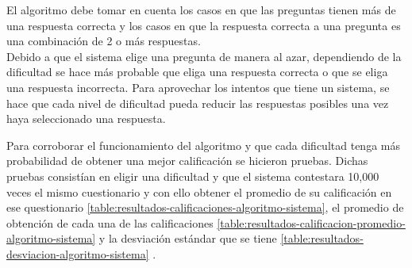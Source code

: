 \clearpage
    El algoritmo debe tomar en cuenta los casos en que las preguntas tienen más de una respuesta correcta 
    y los casos en que la respuesta correcta a una pregunta es una combinación de 2 o más respuestas.\\
\clearpage
    Debido a que el sistema elige una pregunta de manera al azar, 
    dependiendo de la dificultad se hace más probable que eliga una respuesta correcta o que se eliga una respuesta incorrecta.
\clearpage
    Para aprovechar los intentos que tiene un sistema,
    se hace que cada nivel de dificultad pueda reducir las respuestas posibles una vez haya seleccionado una respuesta.
\clearpage


\noindent Para corroborar el funcionamiento del algoritmo y que cada dificultad tenga más probabilidad de obtener una mejor calificación se hicieron pruebas. 
Dichas pruebas consistían en eligir una dificultad y que el sistema contestara 10,000 veces el mismo cuestionario y con ello obtener 
el promedio de su calificación en ese questionario \ref{table:resultados-calificaciones-algoritmo-sistema}, 
el promedio de obtención de cada una de las calificaciones  \ref{table:resultados-calificacion-promedio-algoritmo-sistema} 
y la desviación estándar que se tiene \ref{table:resultados-desviacion-algoritmo-sistema} . 



